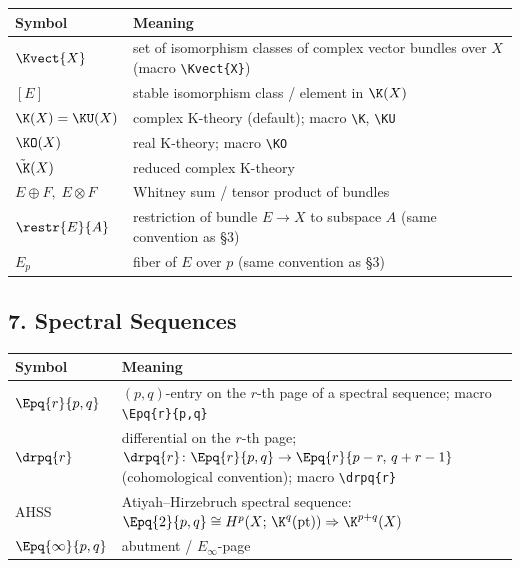 \begin{longtable}{@{} p{4cm} p{10cm} @{}}
	\toprule
	\textbf{Symbol} & \textbf{Meaning} \\
	\midrule
	\endhead
	
	$\Kvect{X}$
	& set of isomorphism classes of complex vector bundles over $X$
	(macro \texttt{\textbackslash Kvect\{X\}}) \\[4pt]
	
	$[E]$
	& stable isomorphism class / element in $\K(X)$ \\[4pt]
	
	$\K(X) = \KU(X)$
	& complex K-theory (default); macro \texttt{\textbackslash K},
	\texttt{\textbackslash KU} \\[4pt]
	
	$\KO(X)$
	& real K-theory; macro \texttt{\textbackslash KO} \\[4pt]
	
	$\tilde{\K}(X)$
	& reduced complex K-theory \\[4pt]
	
	$E\oplus F,\; E\otimes F$
	& Whitney sum / tensor product of bundles \\[4pt]
	
	$\restr{E}{A}$
	& restriction of bundle $E\to X$ to subspace $A$
	(same convention as §3) \\[4pt]
	
	$E_p$
	& fiber of $E$ over $p$ (same convention as §3) \\[4pt]
	
	\bottomrule
\end{longtable}

\subsection*{7. Spectral Sequences}

\begin{longtable}{@{} p{4cm} p{10cm} @{}}
	\toprule
	\textbf{Symbol} & \textbf{Meaning} \\
	\midrule
	\endhead
	
	$\Epq{r}{p,q}$
	& $(p,q)$-entry on the $r$-th page of a spectral sequence;
	macro \texttt{\textbackslash Epq\{r\}\{p,q\}} \\[4pt]
	
	$\drpq{r}$
	& differential on the $r$-th page;
	$\drpq{r}\colon \Epq{r}{p,q}\to \Epq{r}{p-r,\,q+r-1}$
	(cohomological convention);
	macro \texttt{\textbackslash drpq\{r\}} \\[4pt]
	
	AHSS
	& Atiyah--Hirzebruch spectral sequence:
	$\Epq{2}{p,q}\cong H^p(X;\,\K^q(\mathrm{pt}))
	\Rightarrow \K^{p+q}(X)$ \\[4pt]
	
	$\Epq{\infty}{p,q}$
	& abutment / $E_\infty$-page \\[4pt]
	
	\bottomrule
\end{longtable}

